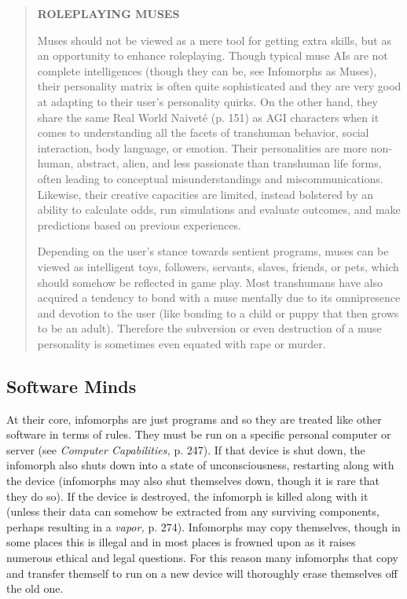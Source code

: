 \begin{quotation}
\textbf{ROLEPLAYING MUSES}

Muses should not be viewed as a mere tool for
getting extra skills, but as an opportunity to
enhance roleplaying. Though typical muse AIs
are not complete intelligences (though they can
be, see Infomorphs as Muses), their personality
matrix is often quite sophisticated and they are
very good at adapting to their user’s personality
quirks. On the other hand, they share the same
Real World Naiveté (p. 151) as AGI characters
when it comes to understanding all the facets
of transhuman behavior, social interaction,
body language, or emotion. Their personalities
are more non-human, abstract, alien, and less
passionate than transhuman life forms, often
leading to conceptual misunderstandings and
miscommunications. Likewise, their creative
capacities are limited, instead bolstered by an
ability to calculate odds, run simulations and
evaluate outcomes, and make predictions based
on previous experiences.

Depending on the user’s stance towards sentient
programs, muses can be viewed as intelligent
toys, followers, servants, slaves, friends,
or pets, which should somehow be reflected in
game play. Most transhumans have also acquired
a tendency to bond with a muse mentally due to
its omnipresence and devotion to the user (like
bonding to a child or puppy that then grows to
be an adult). Therefore the subversion or even
destruction of a muse personality is sometimes
even equated with rape or murder.
\end{quotation}


\subsection{Software Minds}

At their core, infomorphs are just programs and so 
they are treated like other software in terms of rules. 
They must be run on a specific personal computer or 
server (see \textit{Computer Capabilities,} p. 247). If that 
device is shut down, the infomorph also shuts down 
into a state of unconsciousness, restarting along with 
the device (infomorphs may also shut themselves 
down, though it is rare that they do so). If the device is 
destroyed, the infomorph is killed along with it (unless 
their data can somehow be extracted from any surviving
components, perhaps resulting in a \textit{vapor,} p. 274).
Infomorphs may copy themselves, though in some 
places this is illegal and in most places is frowned 
upon as it raises numerous ethical and legal questions. 
For this reason many infomorphs that copy and transfer
themself to run on a new device will thoroughly
erase themselves off the old one.


